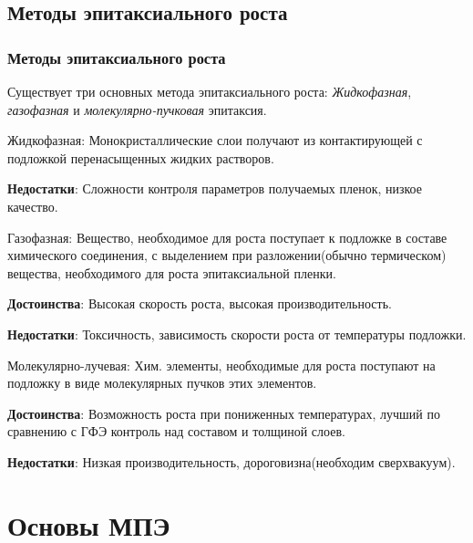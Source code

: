 \documentclass[10pt,pdf,hyperref={unicode}, dvipsnames]{beamer}
\begin{document}
\subsection{Методы эпитаксиального роста}
\begin{frame}[t]
	\frametitle{Методы эпитаксиального роста}
	Существует три основных метода эпитаксиального роста: \textit{Жидкофазная}, \textit{газофазная} и
	\textit{молекулярно-пучковая} эпитаксия.
	\vspace{10pt}

	Жидкофазная: Монокристаллические слои получают из контактирующей с подложкой перенасыщенных жидких растворов.

	\textbf{Недостатки}: Сложности контроля параметров получаемых пленок, низкое качество. 
	\vspace{10pt}

	Газофазная: Вещество, необходимое для роста поступает к подложке в составе химического соединения, с выделением при
	разложении(обычно термическом) вещества, необходимого для роста эпитаксиальной пленки.

	\textbf{Достоинства}: Высокая скорость роста, высокая производительность.

	\textbf{Недостатки}: Токсичность, зависимость скорости роста от температуры подложки.
	\vspace{10pt}

	Молекулярно-лучевая: Хим. элементы, необходимые для роста поступают на подложку в виде молекулярных пучков этих
	элементов.
	
	\textbf{Достоинства}: Возможность роста при пониженных температурах, лучший по сравнению с ГФЭ контроль над составом и
	толщиной слоев.

	\textbf{Недостатки}: Низкая производительность, дороговизна(необходим сверхвакуум).
\end{frame}

\section{Основы МПЭ}
\end{document}
